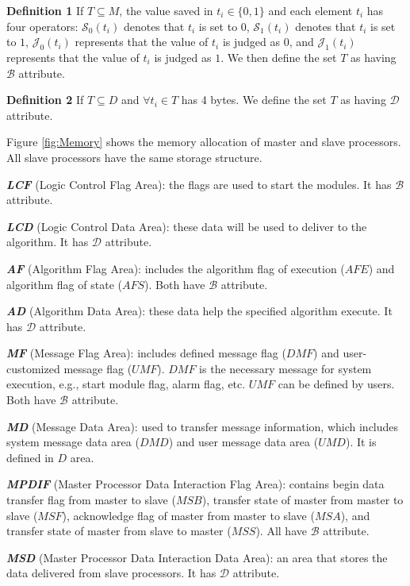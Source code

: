 \documentclass[journal,UTF8]{IEEEtran}
\begin{document}
\textbf{Definition 1} If $ T \subseteq M$, the value saved in $t_{i} \in \{0, 1\} $ and each element $t_i$ has four operators: $\mathcal{S}_0(t_i)$ denotes that $t_i$ is set to $0$, $\mathcal{S}_1(t_i)$ denotes that $t_i$ is set to $1$, $\mathcal{J}_0(t_i)$ represents that the value of $t_i$ is judged as $0$, and $\mathcal{J}_1(t_i)$ represents that the value of $t_i$ is judged as $1$. We then define the set $T$ as having $\mathcal{B}$ attribute.

\textbf{Definition 2} If $ T \subseteq D$ and $\forall t_{i} \in T$ has 4 bytes. We define the set $T$ as having $\mathcal{D}$ attribute.


Figure \ref{fig:Memory} shows the memory allocation of master and slave processors. All slave processors have the same storage structure.

\textbf{\emph{LCF}} (Logic Control Flag Area): the flags are used to start the modules. It has $\mathcal{B}$ attribute.

\textbf{\emph{LCD}} (Logic Control Data Area): these data will be used to deliver to the algorithm. It has $\mathcal{D}$ attribute.

\textbf{\emph{AF}} (Algorithm Flag Area): includes the algorithm flag of execution ($AFE$) and algorithm flag of state ($AFS$). Both have $\mathcal{B}$ attribute.

\textbf{\emph{AD}} (Algorithm Data Area): these data help the specified algorithm execute. It has $\mathcal{D}$ attribute.

\textbf{\emph{MF}} (Message Flag Area): includes defined message flag ($DMF$) and user-customized message flag ($UMF$). $DMF$ is the necessary message for system execution, e.g., start module flag, alarm flag, etc. $UMF$ can be defined by users. Both have $\mathcal{B}$ attribute.

\textbf{\emph{MD}} (Message Data Area): used to transfer message information, which includes system message data area ($DMD$) and user message data area ($UMD$). It is defined in $D$ area.

\textbf{\emph{MPDIF}} (Master Processor Data Interaction Flag Area): contains begin data transfer flag from master to slave ($MSB$), transfer state of master from master to slave ($MSF$), acknowledge flag of master from master to slave ($MSA$), and transfer state of master from slave to master ($MSS$). All have $\mathcal{B}$ attribute.

\textbf{\emph{MSD}} (Master Processor Data Interaction Data Area): an area that stores the data delivered from slave processors. It has $\mathcal{D}$ attribute.
\end{document}
